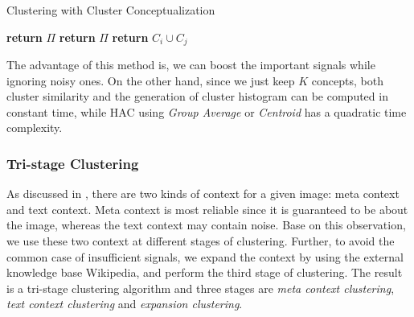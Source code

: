 \renewcommand\algorithmicrequire{\textbf{Input:}}
\renewcommand\algorithmicensure {\textbf{Output:}}
\begin{algorithm}[th]
\caption{Clustering with Cluster Conceptualization}
\label{haccc}
\begin{algorithmic}[1]
 
\EndFor
\EndFor
{}
\State \textbf{return} $\Pi$
\EndIf
{}
\EndFor
\State \textbf{return} $\Pi$
\EndFunction
\Statex
{}
\EndIf
\EndFor
\State \textbf{return} {$C_i\cup C_j$}
\EndFunction
\end{algorithmic}
\end{algorithm}

The advantage of this method is,
we can boost the important signals while ignoring noisy ones.
On the other hand, since we just keep $K$ concepts,
both cluster similarity and the generation
of cluster histogram can be computed in constant time,
while HAC using \emph{Group Average} or
\emph{Centroid} has a quadratic time complexity.

\subsubsection{Tri-stage Clustering}
As discussed in , there are two kinds of context for a given image:
meta context and text context. Meta context is most reliable since it is guaranteed to be
about the image, whereas the text context may contain noise. Base on this observation,
we use these two context at different stages of clustering. Further,
to avoid the common case of insufficient signals, we expand the context by
using the external knowledge base Wikipedia, and perform the third stage of clustering.
The result is a tri-stage clustering algorithm and three stages are {\em meta context clustering},
{\em text context clustering} and {\em expansion clustering}.

